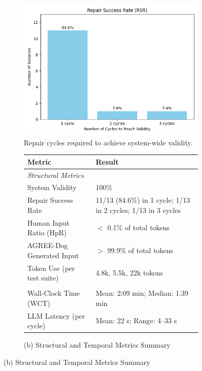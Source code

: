 \begin{figure}[t]
  \centering
  \caption{AGREE-Dog Evaluation Metrics and Convergence}
  \label{fig:agree-metrics-combined}

\begin{subfigure}{\textwidth}
    \centering
    \includegraphics[width=0.6\linewidth]{repair-histogram.png}
    \caption{Repair cycles required to achieve system-wide validity.}
    \label{fig:repair-histogram}
  \end{subfigure}

  \vspace{1em}
  
  \begin{subfigure}{\textwidth}
    \centering
    \caption*{(b) Structural and Temporal Metrics Summary}
    \begin{minipage}{\textwidth}
      \centering
      \begin{tabular}{@{}p{} p{}@{}}
        \toprule
        \textbf{Metric} & \textbf{Result} \\
        \midrule
        \multicolumn{2}{l}{\textit{Structural Metrics}} \\
        System Validity & 100\% \\
        Repair Success Rate & 11/13 (84.6\%) in 1 cycle; 1/13 in 2 cycles; 1/13 in 3 cycles \\
        Human Input Ratio (HpR) & $<$ 0.1\% of total tokens \\
        AGREE-Dog Generated Input & $>$ 99.9\% of total tokens \\
        Token Use (per test suite) & 4.8k, 5.5k, 22k tokens \\
        \addlinespace
        \multicolumn{2}{l}{\textit{Temporal Metrics}} \\
        Wall-Clock Time (WCT) & Mean: 2:09 min; Median: 1:39 min \\
        LLM Latency (per cycle) & Mean: 22 s; Range: 4--33 s \\
        \bottomrule
      \end{tabular}
    \end{minipage}
  \end{subfigure}

\end{figure}